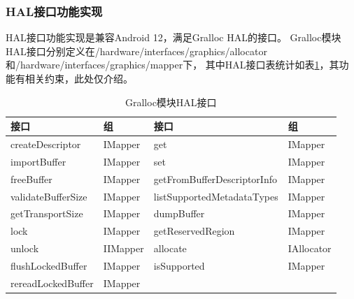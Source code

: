 
\subsubsection{HAL接口功能实现}
HAL接口功能实现是兼容Android 12，满足Gralloc HAL的接口。
Gralloc模块HAL接口分别定义在/hardware/interfaces/graphics/allocator和/hardware/interfaces/graphics/mapper下，
其中HAL接口表统计如表\ref{tab:gralloc模块HAL接口}，其功能有相关约束，此处仅介绍。

\begin{table}[h]
  \centering
  \caption{Gralloc模块HAL接口}
  \label{tab:gralloc模块HAL接口}
  \begin{tabular}{llll}
    \toprule
    接口  & 组 & 接口 & 组\\
    \midrule
    createDescriptor & IMapper & get & IMapper \\
    importBuffer & IMapper & set & IMapper\\
    freeBuffer & IMapper & getFromBufferDescriptorInfo & IMapper\\
    validateBufferSize & IMapper & listSupportedMetadataTypes & IMapper\\
    getTransportSize & IMapper & dumpBuffer  & IMapper\\
    lock & IMapper & getReservedRegion & IMapper\\
    unlock & IIMapper & allocate & IAllocator\\
    flushLockedBuffer & IMapper & isSupported & IMapper\\
    rereadLockedBuffer & IMapper \\
    \bottomrule
  \end{tabular}
  \note{}
\end{table}

